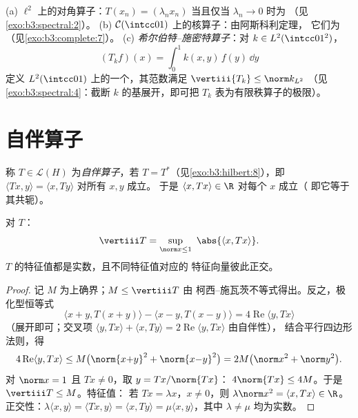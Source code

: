 \begin{example}\label{ex:b3:spectral:examples}
(a) $\ell^2$ 上的对角算子：$T(x_n) = (\lambda_nx_n)$
当且仅当 $\lambda_n \to 0$ 时为
（见\cref{exo:b3:spectral:2}）。
(b) $\mathcal C(\intcc01)$ 上的核算子：由阿斯科利定理，
它们为（见\cref{exo:b3:complete:7}）。
(c) \emph{希尔伯特–施密特算子}：对 $k \in L^2(\intcc01^2)$，
\[
(T_kf)(x) = \int_0^1k(x, y)\,f(y)\,\dd y
\]
定义 $L^2(\intcc01)$ 上的一个，其范数满足
$\vertiii{T_k} \leq \norm k_{L^2}$
（见\cref{exo:b3:spectral:4}：截断
$k$ 的基展开，即可把 $T_k$ 表为有限秩算子的极限）。
\end{example}

\section{自伴算子}

\begin{definition}\label{def:b3:spectral:selfadjoint}
称 $T \in \mathcal L(H)$ 为\emph{自伴算子}，若 $T = T^*$（见\cref{exo:b3:hilbert:8}），即
$\langle Tx, y\rangle = \langle x, Ty\rangle$ 对所有 $x, y$ 成立。
于是 $\langle x, Tx\rangle \in \R$ 对每个 $x$ 成立（
即它等于其共轭）。
\end{definition}

\begin{proposition}\label{prop:b3:spectral:sanorm}
对 $T$：
\[
\vertiii T = \sup_{\norm x \leq 1}\ \abs{\langle x,
Tx\rangle} .
\]
$T$ 的特征值都是实数，且不同特征值对应的
特征向量彼此正交。
\end{proposition}

\begin{proof}
记 $M$ 为上确界；$M \leq \vertiii T$ 由
柯西–施瓦茨不等式得出。反之，极化型恒等式
\[
\langle x{+}y, T(x{+}y)\rangle - \langle x{-}y,
T(x{-}y)\rangle = 4\operatorname{Re}\langle y, Tx\rangle
\]
（展开即可；交叉项 $\langle y, Tx\rangle + \langle x,
Ty\rangle = 2\operatorname{Re}\langle y, Tx\rangle$ 由自伴性），
结合平行四边形法则，得
\[
4\operatorname{Re}\langle y, Tx\rangle \leq
M\bigl(\norm{x{+}y}^2 + \norm{x{-}y}^2\bigr) = 2M\bigl(\norm
x^2 + \norm y^2\bigr).
\]
对 $\norm x = 1$ 且 $Tx \neq 0$，取 $y = Tx/\norm{Tx}$：
$4\norm{Tx} \leq 4M$。于是 $\vertiii T \leq M$。特征值：
若 $Tx = \lambda x$，$x \ne 0$，则 $\lambda\norm x^2 = \langle
x, Tx\rangle \in \R$。正交性：$\lambda\langle x,
y\rangle = \langle Tx, y\rangle = \langle x, Ty\rangle =
\mu\langle x, y\rangle$，其中 $\lambda \neq \mu$ 均为实数。
\end{proof}

